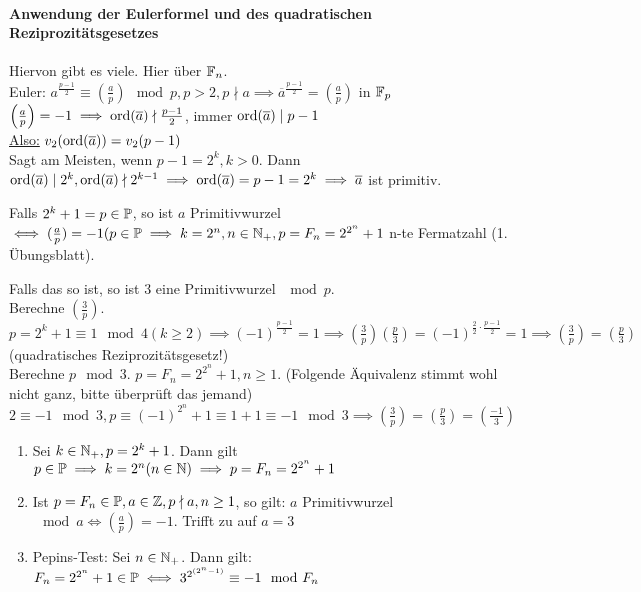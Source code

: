 \documentclass[a4paper,twoside,DIV15,BCOR12mm]{scrbook}
\begin{document}
\paragraph{Anwendung der Eulerformel und des quadratischen
Reziprozitätsgesetzes}
Hiervon gibt es viele. Hier über $\mathbb{F}_n$.\\
Euler: $a^{\frac{p-1}{2}} \equiv \left(\frac{a}{p}\right) \mod p, p > 2, p \nmid a \implies \overline a^{\frac{p-1}{2}} = \left(\frac{a}{p}\right)$ in $\mathbb{F}_p$\\
$\left(\frac{a}{p}\right) = -1 \implies \mathop{\rm ord}\nolimits(\overline a) \nmid \frac{p-1}{2}$, immer $\mathop{\rm ord}\nolimits(\overline a) \mid p-1$\\
\underline{Also:} $v_2(\mathop{\rm ord}\nolimits(\overline a)) = v_2(p-1)$\\
Sagt am Meisten, wenn $p-1 = 2^k, k > 0$. Dann $\mathop{\rm ord}\nolimits(\overline a)
\mid 2^k, \mathop{\rm ord}\nolimits(\overline a) \nmid 2^{k-1} \implies \mathop{\rm ord}\nolimits(\overline a)
= p-1 = 2^k \implies \overline a$ ist primitiv.

Falls $2^k + 1 = p \in \mathbb{P}$, so ist $a$ Primitivwurzel $\iff
(\frac{a}{p}) = -1 (p \in \mathbb{P} \implies k = 2^n, n \in \mathbb{N}_+, p =
F_n = 2^{2^n}+1$ n-te Fermatzahl (1. Übungsblatt).

Falls das so ist, so ist $3$ eine Primitivwurzel $\mod p$.\\
Berechne $(\frac{3}{p})$. $p = 2^k + 1 \equiv 1 \mod 4 (k \ge 2) \implies (-1)^{\frac{p-1}{2}} = 1 \implies (\frac{3}{p})(\frac{p}{3}) = (-1)^{\frac{2}{2} \cdot \frac{p-1}{2}} = 1 \implies (\frac{3}{p}) = (\frac{p}{3})$ (quadratisches Reziprozitätsgesetz!)\\
Berechne $p \mod 3$. $p = F_n = 2^{2^n}+1, n \ge 1$. (Folgende
Äquivalenz stimmt wohl nicht ganz, bitte überprüft das jemand) $2
\equiv -1 \mod 3, p \equiv (-1)^{2^n} + 1 \equiv 1 + 1 \equiv -1
\mod 3 \implies \left(\frac{3}{p}\right) = \left(\frac{p}{3}\right)
= \left(\frac{-1}{3}\right)$

\begin{satz}
    \begin{enumerate}
        \item Sei $k \in \mathbb{N}_+, p = 2^k + 1$. Dann gilt $p \in \mathbb{P} \implies k = 2^n (n \in \mathbb{N}) \implies p = F_n = 2^{2^n} + 1$
        \item Ist $p = F_n \in \mathbb{P}, a \in \mathbb{Z}, p \nmid a, n \ge 1$, so gilt: $a$ Primitivwurzel $\mod a \iff (\frac{a}{p}) = -1$. Trifft zu auf $a = 3$
        \item Pepins-Test: Sei $n \in \mathbb{N}_+$. Dann gilt: $F_n = 2^{2^n} + 1 \in \mathbb{P} \iff 3^{2^{(2^n - 1)}} \equiv -1 \mod F_n$
    \end{enumerate}
\end{satz}
\end{document}
